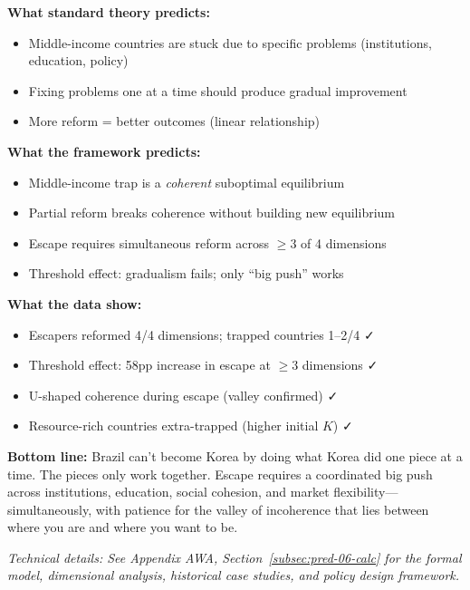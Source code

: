 \begin{tcolorbox}[colback=gray!5!white, colframe=gray!75!black, title=Prediction 6: Coherence Trap]
\textbf{What standard theory predicts:}
\begin{itemize}
    \item Middle-income countries are stuck due to specific problems (institutions, 
    education, policy)
    \item Fixing problems one at a time should produce gradual improvement
    \item More reform = better outcomes (linear relationship)
\end{itemize}

\textbf{What the framework predicts:}
\begin{itemize}
    \item Middle-income trap is a \emph{coherent} suboptimal equilibrium
    \item Partial reform breaks coherence without building new equilibrium
    \item Escape requires simultaneous reform across $\geq 3$ of 4 dimensions
    \item Threshold effect: gradualism fails; only ``big push'' works
\end{itemize}

\textbf{What the data show:}
\begin{itemize}
    \item Escapers reformed 4/4 dimensions; trapped countries 1--2/4 ✓
    \item Threshold effect: 58pp increase in escape at $\geq 3$ dimensions ✓
    \item U-shaped coherence during escape (valley confirmed) ✓
    \item Resource-rich countries extra-trapped (higher initial $K$) ✓
\end{itemize}

\textbf{Bottom line:} Brazil can't become Korea by doing what Korea did 
one piece at a time. The pieces only work together. Escape requires a 
coordinated big push across institutions, education, social cohesion, 
and market flexibility---simultaneously, with patience for the valley 
of incoherence that lies between where you are and where you want to be.
\end{tcolorbox}

\vspace{0.5em}
\noindent\textit{Technical details: See Appendix AWA, Section~\ref{subsec:pred-06-calc} for the 
formal model, dimensional analysis, historical case studies, and policy 
design framework.}

